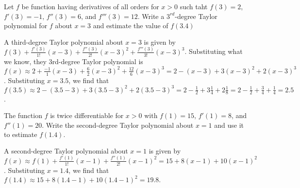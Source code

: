 \begin{Exercise} Let $f$ be function having 
derivatives of all orders for $x > 0$ such taht $f(3) = 2$, $f'(3) = -1$, 
$f''(3) = 6$, and $f'''(3) = 12$. Write a $3^{rd}$-degree Taylor polynomial 
for $f$ about $x = 3$ and estimate the value of $f(3.4)$
\end{Exercise}

\begin{Answer}[ref = taylor1]
A third-degree Taylor polynomial about $x = 3$ is given by $f(3) + \frac{
f'(3)}{1!} (x - 3) + \frac{f''(3)}{2!} (x - 3) ^ 2 + \frac{f'''(3)}{3!} (x - 3) 
^ 3$. Substituting what we know, they 3rd-degree Taylor polynomial is $f(x) 
\approx 2 + \frac{-1}{1} (x - 3) + \frac{6}{2} (x - 3) ^ 2 + \frac{12}{6}(x - 
3) ^ 3 = 2 - (x - 3) + 3 (x - 3) ^ 2 + 2 (x - 3) ^ 3$. Substituting $x = 3.5$, 
we find that $f(3.5) \approx 2 - (3.5 - 3) + 3 ( 3.5 - 3) ^ 2 + 2 (3.5 - 3) ^ 3 
= 2 - \frac{1}{2} + 3 \frac{1}{4} + 2\frac{1}{8} = 2 - \frac{1}{2} + 
\frac{3}{4} + \frac{1}{4} = 2.5$.
\end{Answer}

\begin{Exercise} The function $f$ is twice 
differentiable for $x > 0$ with $f(1) = 15$, $f'(1) = 8$, and $f''(1) = 20$. 
Write the second-degree Taylor polynomial about $x = 1$ and use it to 
estimate $f(1.4)$.
\end{Exercise}

\begin{Answer}
A second-degree Taylor polynomial about $x = 1$ is given by $f(x) \approx f(1) 
+ \frac{f'(1)}{1!}(x - 1) + \frac{f''(1)}{2!}(x - 1)^2 = 15 + 8(x - 1) + 10(x 
- 1)^2$. Substituting $x = 1.4$, we find that $f(1.4) \approx 15 + 8(1.4 - 1) 
+ 10(1.4 - 1)^2 = 19.8$.
\end{Answer}


